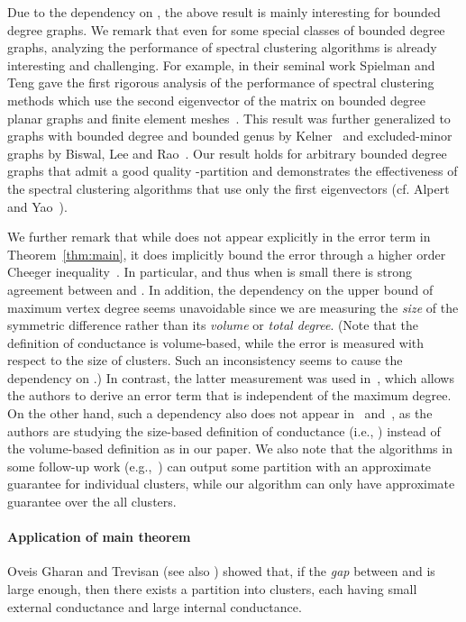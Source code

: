 \documentclass[11pt]{article}
\theoremstyle{plain}
\begin{document}
Due to the dependency on , the above result is mainly interesting for bounded degree graphs. We remark that even for some special classes of bounded degree graphs, analyzing the performance of spectral clustering algorithms is already interesting and challenging. For example, in their seminal work Spielman and Teng gave the first rigorous analysis of the performance of spectral clustering methods which use the second eigenvector of the matrix  on bounded degree planar graphs and finite element meshes~\cite{ST2007}. This result was further generalized to graphs with bounded degree and bounded genus by Kelner~\cite{DBLP:journals/siamcomp/Kelner06} and excluded-minor graphs by Biswal, Lee and Rao~\cite{DBLP:journals/jacm/BiswalLR10}. Our result holds for arbitrary bounded degree graphs that admit a good quality -partition and demonstrates the effectiveness of the spectral clustering algorithms that use only the first  eigenvectors (cf. Alpert and Yao~\cite{DBLP:conf/dac/AlpertY95}).

We further remark that while  does not appear explicitly in the error
term in Theorem~\ref{thm:main}, it does implicitly bound the error through a
higher order Cheeger inequality~\cite{DBLP:conf/stoc/LeeGT12}. In particular,
 and thus when
 is small there is strong agreement
between  and . In addition, the dependency on the upper bound  of maximum vertex degree seems unavoidable since we are measuring
the \emph{size} of the symmetric difference 
rather than its \emph{volume} or \emph{total degree}. (Note that the definition of conductance is volume-based, while the error is measured with respect to the size of clusters. Such an inconsistency seems to cause the dependency on .) In contrast, the latter
measurement was used in~\cite{DBLP:conf/colt/PengSZ15}, which allows the
authors to derive an error term that is independent of the maximum degree. On the other hand, such a dependency also does not
appear in~\cite{DBLP:conf/innovations/AwasthiCKS16} and~\cite{DBLP:conf/soda/Sinop16}, as the authors are
studying the size-based definition of conductance (i.e.,
) instead of the
volume-based definition as in our paper. We also note that the algorithms in some follow-up work (e.g.,~\cite{DBLP:conf/innovations/AwasthiCKS16,DBLP:conf/colt/PengSZ15}) can output some partition with an approximate guarantee
for individual clusters, while our algorithm can only have approximate guarantee over the all  clusters. 

\paragraph*{Application of main theorem} Oveis Gharan and Trevisan
\cite{DBLP:conf/soda/GharanT14} (see also \cite{Tanaka:2011vk}) showed that, if
the \emph{gap} between  and  is large enough, then
there exists a partition into  clusters, each having small external
conductance and large internal conductance.
\end{document}
